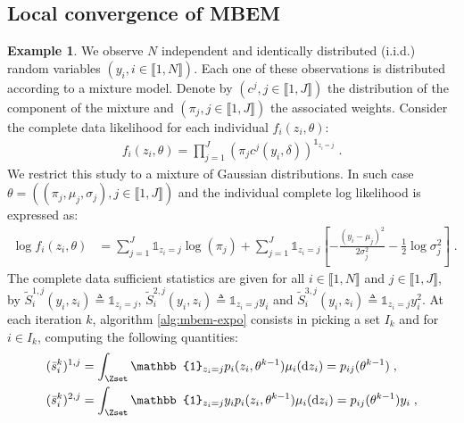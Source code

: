 \documentclass[11pt]{article}
\theoremstyle{plain}
\def\eqs{\;}
\newcommand{\indic}{\mathbb{1}}
\newcommand{\inter}{\llbracket1,N\rrbracket}
\theoremstyle{plain}
\theoremstyle{definition}
\newtheorem{exmp}{Example} %
\newcommand{\dz}{\mathrm{d}z}
\begin{document}
\subsection{Local convergence of MBEM}



\clearpage 
\begin{exmp}
We observe $N$ independent and identically distributed (i.i.d.) random variables $ (y_i, i \in \inter)$. Each one of these observations is distributed according to a mixture model. Denote by $(c^j, j \in \llbracket 1, J \rrbracket)$ the distribution of the component of the mixture and $(\pi_j, j \in \llbracket 1, J \rrbracket)$ the associated weights. Consider the complete data likelihood for each individual $f_i( z_i, \theta)$:
\begin{align} \label{eq1}
f_i( z_i, \theta) = \prod_{j=1}^{J}{(\pi_j c^j(y_i,\delta))^{\indic_{z_i=j}}}\eqs.
\end{align}
We restrict this study to a mixture of Gaussian distributions. In such case $\theta = ((\pi_j, \mu_j, \sigma_j), j \in \llbracket 1, J \rrbracket)$ and the individual complete log likelihood is expressed as:
\begin{align}
\log f_i( z_i, \theta) & = \sum_{j=1}^{J}{\indic_{z_i=j}\log(\pi_j)} + \sum_{j=1}^{J}{\indic_{z_i=j}\left[-\frac{(y_i - \mu_j)^2}{2\sigma^2_j} - \frac{1}{2}\log \sigma^2_j\right]}\eqs.
\end{align}
The complete data sufficient statistics are given for all $i \in \inter$ and $j \in \llbracket1,J\rrbracket$, by $\tilde{S}_i^{1,j}(y_i,z_i) \triangleq \mathbb{1}_{z_i=j}$, $\tilde{S}_i^{2,j}(y_i,z_i) \triangleq \indic_{z_i=j}y_i$ and $\tilde{S}_i^{3,j}(y_i,z_i) \triangleq \indic_{z_i=j}y_i^2$.
At each iteration $k$, algorithm \ref{alg:mbem-expo} consists in picking a set $I_k$ and for $i \in I_k$, computing the following quantities:
\begin{align}
& (\bar{s}_i^k)^{1,j} = \int_{\Zset}{\indic_{z_i=j}p_i(z_i,\theta^{k-1}) \mu_i(\dz_i)} = p_{ij}(\theta^{k-1})\eqs,\\
& (\bar{s}_i^k)^{2,j} = \int_{\Zset}{\indic_{z_i=j}y_ip_i(z_i,\theta^{k-1}) \mu_i(\dz_i)} = p_{ij}(\theta^{k-1})y_i\eqs,\\

\end{align}
\end{exmp}
\end{document}
